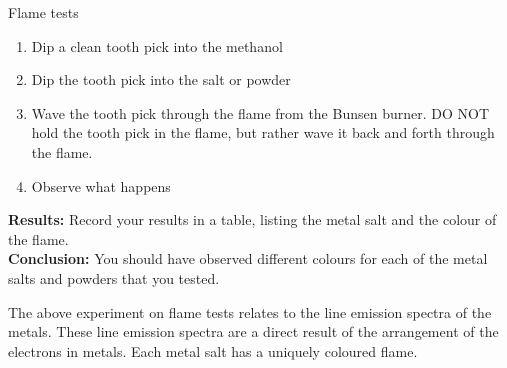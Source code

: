 \begin{i_experiment}{Flame tests}
{\begin{enumerate}[noitemsep, label=\textbf{\arabic*}. ]
            \item Dip a clean tooth pick into the methanol\item Dip the tooth pick into the salt or powder
\item Wave the tooth pick through the flame from the Bunsen burner. DO NOT hold the tooth pick in the flame, but rather wave it back and forth through the flame.
\item Observe what happens\end{enumerate}
\label{m38741*eip-6993}\noindent{}\textbf{Results: } Record your results in a table, listing the metal salt and the colour of the flame.
\\ 
\label{m38741*eip-6994}\noindent{}\textbf{Conclusion: } You should have observed different colours for each of the metal salts and powders that you tested.}
\end{i_experiment}
The above experiment on flame tests relates to the line emission spectra of the metals. These line emission spectra are a direct result of the arrangement of the electrons in metals. Each metal salt has a uniquely coloured flame.

